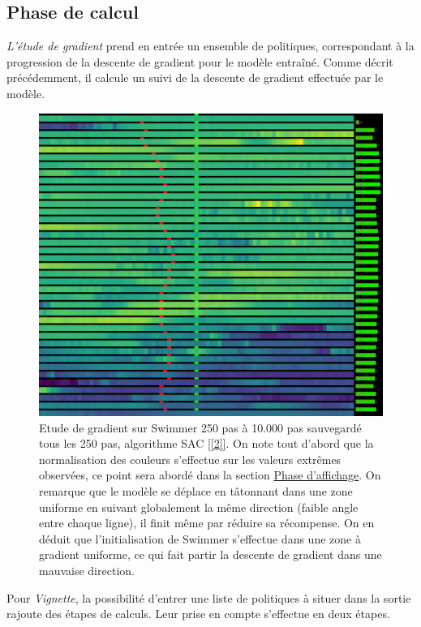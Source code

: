 \documentclass[12pt]{article}
\begin{document}
\subsection{Phase de calcul}

\emph{L'étude de gradient} prend en entrée un ensemble de politiques, correspondant à la progression de la descente de gradient pour le modèle entraîné. Comme décrit précédemment, il calcule un suivi de la descente de gradient effectuée par le modèle. \\

\begin{figure}[htp]
    \centering
    \includegraphics[width=15cm]{Images/gradientStudy_swimmer}
    \caption{Etude de gradient sur Swimmer 250 pas à 10.000 pas sauvegardé tous les 250 pas, algorithme SAC \ref{[2]}. On note tout d'abord que la normalisation des couleurs s'effectue sur les valeurs extrêmes observées, ce point sera abordé dans la section \hyperref[sec:affichage]{Phase d'affichage}. On remarque que le modèle se déplace en tâtonnant dans une zone uniforme en suivant globalement la même direction (faible angle entre chaque ligne), il finit même par réduire sa récompense. On en déduit que l'initialisation de Swimmer s'effectue dans une zone à gradient uniforme, ce qui fait partir la descente de gradient dans une mauvaise direction.}
    \label{fig:gradientStudy}
\end{figure}

Pour \emph{Vignette}, la possibilité d'entrer une liste de politiques à situer dans la sortie rajoute des étapes de calculs. Leur prise en compte s'effectue en deux étapes. \\
\end{document}
